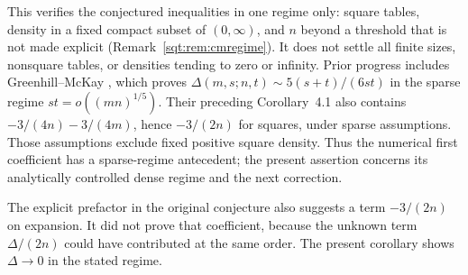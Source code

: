 This verifies the conjectured inequalities in one regime only: square tables, density in a fixed compact subset of $(0,\infty)$, and $n$ beyond a threshold that is not made explicit (Remark~\ref{sqt:rem:cmregime}). It does not settle all finite sizes, nonsquare tables, or densities tending to zero or infinity. Prior progress includes Greenhill--McKay \cite[Corollary~4.2]{GM}, which proves
$\Delta(m,s;n,t)\sim5(s+t)/(6st)$ in the sparse regime
$st=o((mn)^{1/5})$. Their preceding Corollary~4.1 also contains $-3/(4n)-3/(4m)$, hence $-3/(2n)$ for squares, under sparse assumptions. Those assumptions exclude fixed positive square density. Thus the numerical first coefficient has a sparse-regime antecedent; the present assertion concerns its analytically controlled dense regime and the next correction.

The explicit prefactor in the original conjecture also suggests a term $-3/(2n)$ on expansion. It did not prove that coefficient, because the unknown term $\Delta/(2n)$ could have contributed at the same order. The present corollary shows $\Delta\to0$ in the stated regime.

